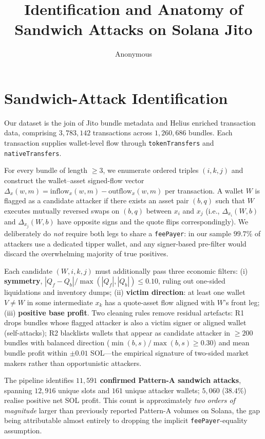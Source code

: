 \documentclass[sigconf,nonacm,11pt]{acmart}
\begin{document}
\title{Identification and Anatomy of Sandwich Attacks on Solana Jito}
\author{Anonymous}
\maketitle

\section{Sandwich-Attack Identification}
\label{sec:detection}

Our dataset is the join of Jito bundle metadata and Helius enriched
transaction data, comprising $3{,}783{,}142$ transactions across
$1{,}260{,}686$ bundles. Each transaction supplies wallet-level flow
through \texttt{tokenTransfers} and \texttt{nativeTransfers}.

For every bundle of length $\geq 3$, we enumerate ordered triples
$(i, k, j)$ and construct the wallet--asset signed-flow vector
$\Delta_x(w, m) = \mathrm{inflow}_x(w, m) - \mathrm{outflow}_x(w, m)$
per transaction.
A wallet $W$ is flagged as a candidate attacker if there exists an
asset pair $(b, q)$ such that $W$ executes mutually reversed swaps on
$(b, q)$ between $x_i$ and $x_j$ (i.e., $\Delta_{x_i}(W, b)$ and
$\Delta_{x_j}(W, b)$ have opposite signs and the quote flips
correspondingly).
We deliberately do \emph{not} require both legs to share a
\texttt{feePayer}: in our sample $99.7\%$ of attackers use a dedicated
tipper wallet, and any signer-based pre-filter would discard the
overwhelming majority of true positives.

Each candidate $(W, i, k, j)$ must additionally pass three economic
filters: (i) \textbf{symmetry}, $|Q_f - Q_b|/\max(|Q_f|, |Q_b|) \leq 0.10$,
ruling out one-sided liquidations and inventory dumps;
(ii) \textbf{victim direction}: at least one wallet $V \neq W$ in some
intermediate $x_k$ has a quote-asset flow aligned with $W$'s front leg;
(iii) \textbf{positive base profit}.
Two cleaning rules remove residual artefacts:
R1 drops bundles whose flagged attacker is also a victim signer or
aligned wallet (self-attacks);
R2 blacklists wallets that appear as candidate attacker in $\geq 200$
bundles with balanced direction ($\min(b,s)/\max(b,s) \geq 0.30$) and
mean bundle profit within $\pm 0.01$ SOL---the empirical signature of
two-sided market makers rather than opportunistic attackers.

The pipeline identifies
\textbf{$11{,}591$ confirmed Pattern-A sandwich attacks},
spanning $12{,}916$ unique slots and $161$ unique attacker wallets;
$5{,}060$ ($38.4\%$) realise positive net SOL profit.
This count is approximately \emph{two orders of magnitude} larger
than previously reported Pattern-A volumes on Solana, the gap being
attributable almost entirely to dropping the implicit
\texttt{feePayer}-equality assumption.
\end{document}
